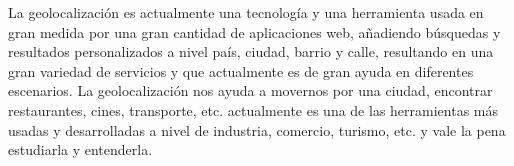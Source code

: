     La geolocalizaci\'on es actualmente una tecnolog\'ia y una herramienta usada en gran medida por una gran cantidad de aplicaciones web, a\~nadiendo b\'usquedas y resultados personalizados a nivel pa\'is, ciudad, barrio y calle, resultando en una gran variedad de servicios y que actualmente es de gran ayuda en diferentes escenarios. La geolocalizaci\'on nos ayuda a movernos por una ciudad, encontrar restaurantes, cines, transporte, etc. actualmente es una de las herramientas m\'as usadas y desarrolladas a nivel de industria, comercio, turismo, etc. y vale la pena estudiarla y entenderla.\\







